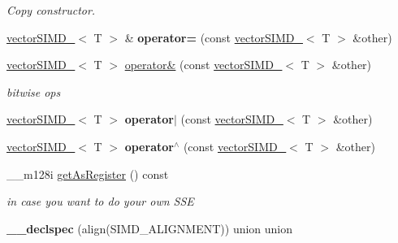 \begin{DoxyCompactItemize}
\begin{DoxyCompactList}\small\item\em Copy constructor. \end{DoxyCompactList}\item 
\hyperlink{classirr_1_1vectorSIMD__32}{vector\+S\+I\+M\+D\+\_}$<$ T $>$ \& {\bfseries operator=} (const \hyperlink{classirr_1_1vectorSIMD__32}{vector\+S\+I\+M\+D\+\_}$<$ T $>$ \&other)\hypertarget{classirr_1_1vectorSIMD__32_a3dc5415539b3b5deeddd354ba5fbc0f8}{}\label{classirr_1_1vectorSIMD__32_a3dc5415539b3b5deeddd354ba5fbc0f8}

\item 
\hyperlink{classirr_1_1vectorSIMD__32}{vector\+S\+I\+M\+D\+\_}$<$ T $>$ \hyperlink{classirr_1_1vectorSIMD__32_adf74b458bb3829ad097724c0644b915a}{operator\&} (const \hyperlink{classirr_1_1vectorSIMD__32}{vector\+S\+I\+M\+D\+\_}$<$ T $>$ \&other)\hypertarget{classirr_1_1vectorSIMD__32_adf74b458bb3829ad097724c0644b915a}{}\label{classirr_1_1vectorSIMD__32_adf74b458bb3829ad097724c0644b915a}

\begin{DoxyCompactList}\small\item\em bitwise ops \end{DoxyCompactList}\item 
\hyperlink{classirr_1_1vectorSIMD__32}{vector\+S\+I\+M\+D\+\_}$<$ T $>$ {\bfseries operator$\vert$} (const \hyperlink{classirr_1_1vectorSIMD__32}{vector\+S\+I\+M\+D\+\_}$<$ T $>$ \&other)\hypertarget{classirr_1_1vectorSIMD__32_adb463d90bd7c59ed553415e942706814}{}\label{classirr_1_1vectorSIMD__32_adb463d90bd7c59ed553415e942706814}

\item 
\hyperlink{classirr_1_1vectorSIMD__32}{vector\+S\+I\+M\+D\+\_}$<$ T $>$ {\bfseries operator$^\wedge$} (const \hyperlink{classirr_1_1vectorSIMD__32}{vector\+S\+I\+M\+D\+\_}$<$ T $>$ \&other)\hypertarget{classirr_1_1vectorSIMD__32_a0678bc896bc316620c8966cd8502268b}{}\label{classirr_1_1vectorSIMD__32_a0678bc896bc316620c8966cd8502268b}

\item 
\+\_\+\+\_\+m128i \hyperlink{classirr_1_1vectorSIMD__32_a369ec6a7fab1710e6484a14188b070ab}{get\+As\+Register} () const \hypertarget{classirr_1_1vectorSIMD__32_a369ec6a7fab1710e6484a14188b070ab}{}\label{classirr_1_1vectorSIMD__32_a369ec6a7fab1710e6484a14188b070ab}

\begin{DoxyCompactList}\small\item\em in case you want to do your own S\+SE \end{DoxyCompactList}\item 
{\bfseries \+\_\+\+\_\+declspec} (align(S\+I\+M\+D\+\_\+\+A\+L\+I\+G\+N\+M\+E\+NT)) union union\hypertarget{classirr_1_1vectorSIMD__32_a8bc661e7edb9d9bc19f46a41a9c58d7c}{}\label{classirr_1_1vectorSIMD__32_a8bc661e7edb9d9bc19f46a41a9c58d7c}

\end{DoxyCompactItemize}

